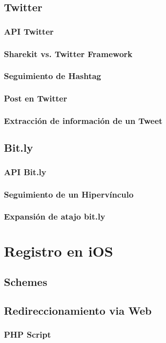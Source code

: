 	\subsection{Twitter}
		\subsubsection{API Twitter}
		\subsubsection{Sharekit vs. Twitter Framework}
		\subsubsection{Seguimiento de Hashtag}
		\subsubsection{Post en Twitter}
		\subsubsection{Extracción de información de un Tweet}
	\subsection{Bit.ly}
		\subsubsection{API Bit.ly}
		\subsubsection{Seguimiento de un Hipervínculo}
		\subsubsection{Expansión de atajo bit.ly}
\clearpage
\section{Registro en iOS}
	\subsection{Schemes}
	\subsection{Redireccionamiento via Web}
		\subsubsection{PHP Script}
